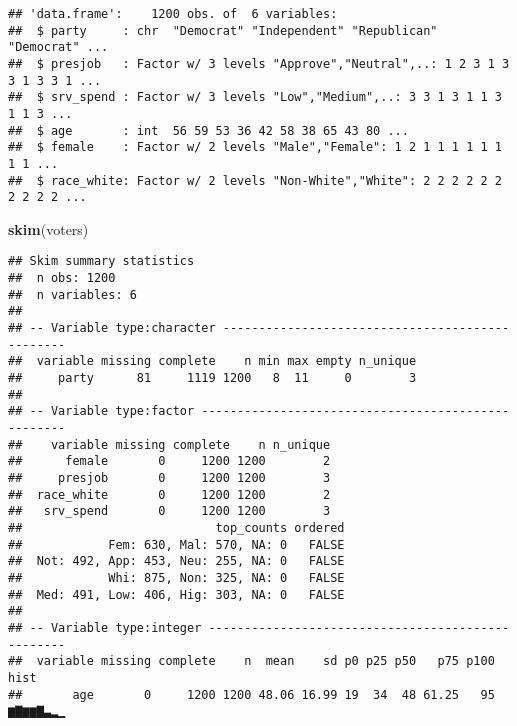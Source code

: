 \documentclass[]{article}
\newenvironment{Shaded}{\begin{snugshade}}{\end{snugshade}}
\newcommand{\KeywordTok}[1]{\textcolor[rgb]{0.13,0.29,0.53}{\textbf{{#1}}}}
\newcommand{\DataTypeTok}[1]{\textcolor[rgb]{0.13,0.29,0.53}{{#1}}}
\newcommand{\StringTok}[1]{\textcolor[rgb]{0.31,0.60,0.02}{{#1}}}
\newcommand{\CommentTok}[1]{\textcolor[rgb]{0.56,0.35,0.01}{\textit{{#1}}}}
\newcommand{\OtherTok}[1]{\textcolor[rgb]{0.56,0.35,0.01}{{#1}}}
\newcommand{\NormalTok}[1]{{#1}}
\begin{document}
\begin{verbatim}
## 'data.frame':    1200 obs. of  6 variables:
##  $ party     : chr  "Democrat" "Independent" "Republican" "Democrat" ...
##  $ presjob   : Factor w/ 3 levels "Approve","Neutral",..: 1 2 3 1 3 3 1 3 3 1 ...
##  $ srv_spend : Factor w/ 3 levels "Low","Medium",..: 3 3 1 3 1 1 3 1 1 3 ...
##  $ age       : int  56 59 53 36 42 58 38 65 43 80 ...
##  $ female    : Factor w/ 2 levels "Male","Female": 1 2 1 1 1 1 1 1 1 1 ...
##  $ race_white: Factor w/ 2 levels "Non-White","White": 2 2 2 2 2 2 2 2 2 2 ...
\end{verbatim}

\begin{Shaded}
\begin{Highlighting}[]
\KeywordTok{skim}\NormalTok{(voters)}
\end{Highlighting}
\end{Shaded}

\begin{verbatim}
## Skim summary statistics
##  n obs: 1200 
##  n variables: 6 
## 
## -- Variable type:character ------------------------------------------------
##  variable missing complete    n min max empty n_unique
##     party      81     1119 1200   8  11     0        3
## 
## -- Variable type:factor ---------------------------------------------------
##    variable missing complete    n n_unique
##      female       0     1200 1200        2
##     presjob       0     1200 1200        3
##  race_white       0     1200 1200        2
##   srv_spend       0     1200 1200        3
##                           top_counts ordered
##            Fem: 630, Mal: 570, NA: 0   FALSE
##  Not: 492, App: 453, Neu: 255, NA: 0   FALSE
##            Whi: 875, Non: 325, NA: 0   FALSE
##  Med: 491, Low: 406, Hig: 303, NA: 0   FALSE
## 
## -- Variable type:integer --------------------------------------------------
##  variable missing complete    n  mean    sd p0 p25 p50   p75 p100     hist
##       age       0     1200 1200 48.06 16.99 19  34  48 61.25   95 ▆▇▆▆▇▃▂▁
\end{verbatim}

\begin{Shaded}
\end{Shaded}
\end{document}
